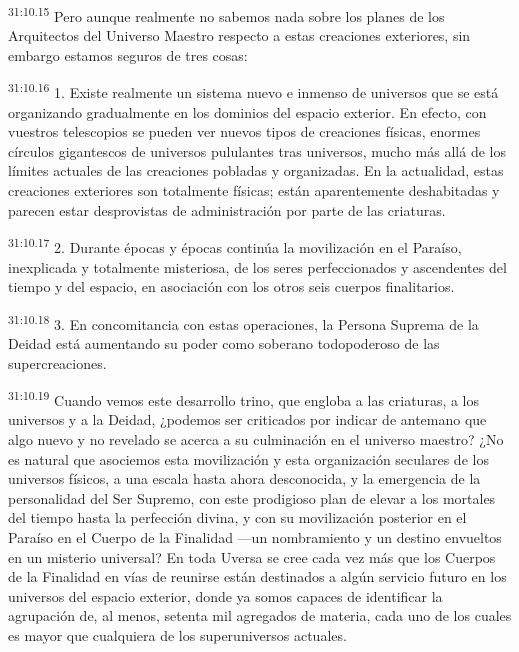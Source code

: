 \par
\textsuperscript{31:10.15} Pero aunque realmente no sabemos nada sobre los planes de los Arquitectos del Universo Maestro respecto a estas creaciones exteriores, sin embargo estamos seguros de tres cosas:

\par
\textsuperscript{31:10.16} 1. Existe realmente un sistema nuevo e inmenso de universos que se está organizando gradualmente en los dominios del espacio exterior. En efecto, con vuestros telescopios se pueden ver nuevos tipos de creaciones físicas, enormes círculos gigantescos de universos pululantes tras universos, mucho más allá de los límites actuales de las creaciones pobladas y organizadas. En la actualidad, estas creaciones exteriores son totalmente físicas; están aparentemente deshabitadas y parecen estar desprovistas de administración por parte de las criaturas.

\par
\textsuperscript{31:10.17} 2. Durante épocas y épocas continúa la movilización en el Paraíso, inexplicada y totalmente misteriosa, de los seres perfeccionados y ascendentes del tiempo y del espacio, en asociación con los otros seis cuerpos finalitarios.

\par
\textsuperscript{31:10.18} 3. En concomitancia con estas operaciones, la Persona Suprema de la Deidad está aumentando su poder como soberano todopoderoso de las supercreaciones.

\par
\textsuperscript{31:10.19} Cuando vemos este desarrollo trino, que engloba a las criaturas, a los universos y a la Deidad, ¿podemos ser criticados por indicar de antemano que algo nuevo y no revelado se acerca a su culminación en el universo maestro? ¿No es natural que asociemos esta movilización y esta organización seculares de los universos físicos, a una escala hasta ahora desconocida, y la emergencia de la personalidad del Ser Supremo, con este prodigioso plan de elevar a los mortales del tiempo hasta la perfección divina, y con su movilización posterior en el Paraíso en el Cuerpo de la Finalidad ---un nombramiento y un destino envueltos en un misterio universal? En toda Uversa se cree cada vez más que los Cuerpos de la Finalidad en vías de reunirse están destinados a algún servicio futuro en los universos del espacio exterior, donde ya somos capaces de identificar la agrupación de, al menos, setenta mil agregados de materia, cada uno de los cuales es mayor que cualquiera de los superuniversos actuales.

